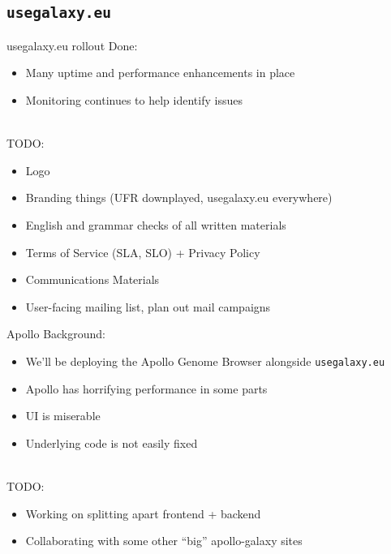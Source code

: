 \documentclass[12pt]{ufrslides}
\begin{document}
\subsection[FR Galaxy]{\texttt{usegalaxy.eu}}

	\begin{frame}{usegalaxy.eu rollout}
		Done:
		\begin{itemize}
			\item Many uptime and performance enhancements in place
			\item Monitoring continues to help identify issues
		\end{itemize}
		\ \\[0.5cm]
		TODO:
		\begin{itemize}
			\item Logo
			\item Branding things (UFR downplayed, usegalaxy.eu everywhere)
			\item English and grammar checks of all written materials
			\item Terms of Service (SLA, SLO) + Privacy Policy
			\item Communications Materials
			\item User-facing mailing list, plan out mail campaigns
		\end{itemize}
	\end{frame}

	\begin{frame}{Apollo}
		Background:
		\begin{itemize}
			\item We'll be deploying the Apollo Genome Browser alongside \texttt{usegalaxy.eu}
			\item Apollo has horrifying performance in some parts
			\item UI is miserable
			\item Underlying code is not easily fixed
		\end{itemize}
		\ \\[0.5cm]
		TODO:
		\begin{itemize}
			\item Working on splitting apart frontend + backend
			\item Collaborating with some other ``big'' apollo-galaxy sites
		\end{itemize}
	\end{frame}
\end{document}

